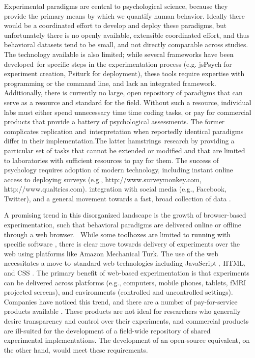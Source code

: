 \documentclass{report}
\begin{document}
Experimental paradigms are central to psychological science, because
they provide the primary means by which we quantify human behavior.
Ideally there would be a coordinated effort to develop and deploy these
paradigms, but unfortunately there is no openly available, extensible
coordinated effort, and thus behavioral datasets tend to be small, and
not directly comparable across studies. The technology available is also
limited; while several frameworks have been developed~for specific steps
in the experimentation process (e.g. jsPsych \cite{De_Leeuw2015-zw}
for experiment creation, Psiturk \cite{McDonnell2012-ns} for
deployment), these tools require expertise with programming or the
command line, and lack an integrated framework. Additionally, there is
currently no large, open repository of paradigms that can serve as a
resource and standard for the field. Without such a resource, individual
labs must either spend unnecessary time time coding tasks, or pay for
commercial products that provide a battery of psychological assessments.
The former complicates replication and~interpretation when reportedly
identical paradigms differ in their implementation.The latter
hamstrings~research by providing a particular set of tasks that cannot
be extended or modified and that are limited to laboratories with
sufficient resources to pay for them. The success of psychology requires
adoption of modern technology, including instant online access to
deploying surveys (e.g., http://www.surveymonkey.com, http://www.qualtrics.com).
integration with social media (e.g., Facebook, Twitter), and a general
movement towards a fast, broad collection of data \cite{Mason2011-fz}.

A promising trend in this disorganized landscape is the growth of
browser-based experimentation, such that behavioral paradigms are
delivered online or offline through a web browser. ~While some toolboxes
are limited to running with specific software \cite{Schneider_W_Eschman_A_and_Zuccolotto_A2012-fe,Brainard1997-rq},
there is clear move towards delivery of experiments over the web using
platforms like Amazon Mechanical Turk. The use of the web necessitates a
move to~standard web technologies including JavaScript \cite{Foundation-jqueryorg_undated-ra},
HTML, and CSS \cite{noauthor_undated-ov,noauthor_undated-qj}.
The primary benefit of web-based experimentation is that experiments can
be delivered across platforms (e.g., computers, mobile phones, tablets,
fMRI projected screens), and environments (controlled and uncontrolled
settings). Companies have noticed this trend, and there are a number of
pay-for-service products available \cite{noauthor_undated-fh,noauthor_undated-rv,noauthor_undated-el}.
These products are not ideal for researchers who generally desire
transparency and control over their experiments, and commercial products
are ill-suited for the development of a field-wide repository of shared
experimental implementations. The development of an open-source
equivalent, on the other hand, would meet these requirements.
\end{document}
